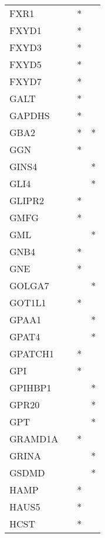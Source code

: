 \begin{longtable}{lccc}
FXR1         &           &   * &         \\
FXYD1        &           &   * &         \\
FXYD3        &           &   * &         \\
FXYD5        &           &   * &         \\
FXYD7        &           &   * &         \\
GALT         &           &   * &         \\
GAPDHS       &           &   * &         \\
GBA2         &           &   * &       * \\
GGN          &           &   * &         \\
GINS4        &           &     &       * \\
GLI4         &           &     &       * \\
GLIPR2       &           &   * &         \\
GMFG         &           &   * &         \\
GML          &           &     &       * \\
GNB4         &           &   * &         \\
GNE          &           &   * &         \\
GOLGA7       &           &     &       * \\
GOT1L1       &           &   * &         \\
GPAA1        &           &     &       * \\
GPAT4        &           &     &       * \\
GPATCH1      &           &   * &         \\
GPI          &           &   * &         \\
GPIHBP1      &           &     &       * \\
GPR20        &           &     &       * \\
GPT          &           &     &       * \\
GRAMD1A      &           &   * &         \\
GRINA        &           &     &       * \\
GSDMD        &           &     &       * \\
HAMP         &           &   * &         \\
HAUS5        &           &   * &         \\
HCST         &           &   * &         \\

\end{longtable}
